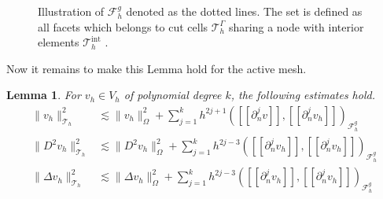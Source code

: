 \documentclass[11pt]{article}
\newtheorem{lemma}[theorem]{Lemma}
\theoremstyle{remark}
\newcommand{\jump}[1]{\left[\!\left[ #1 \right]\!\right]}
\numberwithin{equation}{section}
\begin{document}
\begin{figure}

\caption{Illustration of $\mathcal{F} _{h}^{g}$ denoted as the dotted lines. The set is defined as all facets which belongs to cut cells $\mathcal{T} ^{\Gamma }_{h}$ sharing a node with interior elements $\mathcal{T} ^{\mathrm{int}  }_{h}$ .  }
\label{fig:illustration_F_g}
\end{figure}


Now it remains to make this Lemma hold for the active mesh.


\begin{lemma}
    \label{lemma:bi_inv_gh_lemma}
    For $v_{h} \in  V_{h}$ of polynomial degree $k$, the following estimates hold.
        \begin{subequations}
            \begin{align}
                \label{eq:bi_inv_gh_1}
                \| v_h \|_{ \mathcal{T} _{h} }^{ 2 }  & \lesssim  \| v_h \|_{ \Omega  }^{ 2 }  + \sum_{j=1}^{k} h^{2j+1} ( \jump{ \partial ^{j}_{n} v }, \jump{ \partial ^{j}_{n} v_h}    )_{\mathcal{F}_{h}^{g}}\\
                \label{eq:bi_inv_gh_2}
                \| D ^2 v_h \|_{ \mathcal{T} _{h} }^{ 2 }  & \lesssim  \| D^2 v_h \|_{ \Omega  }^{ 2 }  + \sum_{j=1}^{k} h^{2j-3} ( \jump{ \partial ^{j}_{n} v_h }, \jump{ \partial ^{j}_{n}v_h }    )_{\mathcal{F}_{h}^{g}} \\
                \label{eq:bi_inv_gh_3}
                \| \Delta v_h \|_{ \mathcal{T} _{h} }^{ 2 }  & \lesssim  \| \Delta v_h \|_{ \Omega  }^{ 2 }  + \sum_{j=1}^{k} h^{2j-3} ( \jump{ \partial ^{j}_{n} v_h }, \jump{ \partial ^{j}_{n}v_h }    )_{\mathcal{F}_{h}^{g}}
            \end{align}
        \end{subequations}
\end{lemma}
\end{document}
